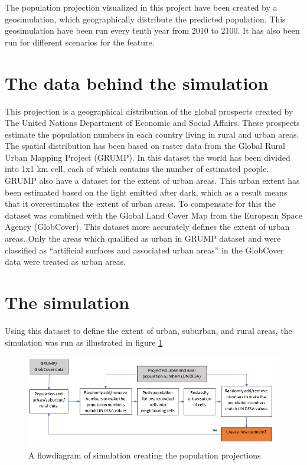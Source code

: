 The population projection visualized in this project have been created by a geosimulation, which geographically distribute the predicted population. This geosimulation have been run every tenth year from 2010 to 2100. It has also been run for different scenarios for the feature.
\section{The data behind the simulation}
This projection is a geographical distribution of the global prospects created by The United Nations Department of Economic and Social Affairs. These prospects estimate the population numbers in each country living in rural and urban areas. The spatial distribution has been based on raster data from the Global Rural Urban Mapping Project (GRUMP). In this dataset the world has been divided into 1x1 km cell, each of which contains the number of estimated people. 
GRUMP also have a dataset for the extent of urban areas. This urban extent has been estimated based on the light emitted after dark, which as a result means that it overestimates the extent of urban areas. To compensate for this the dataset was combined with the Global Land Cover Map from the European Space Agency (GlobCover). This dataset more accurately defines the extent of urban areas. Only the areas which qualified as urban in GRUMP dataset and were classified as “artificial surfaces and associated urban areas” in the GlobCover data were treated as urban areas. 

\section{The simulation}
Using this dataset to define the extent of urban, suburban, and rural areas, the simulation was run as illustrated in figure \ref{CreatingData}

\begin{figure} [H]
	\centering
	\includegraphics[width=.8\textwidth]{Pictures/CreatingData}
	\caption{A flowdiagram of simulation creating the population projections}
	\label{CreatingData}
\end{figure}

